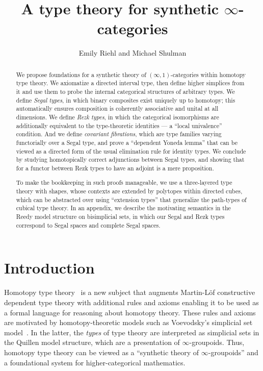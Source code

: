 \documentclass{amsart}
\title{A type theory for synthetic $\infty$-categories}
\author{Emily Riehl and Michael Shulman}
\theoremstyle{plain}
\theoremstyle{definition}
\theoremstyle{remark}
\numberwithin{equation}{section}
\begin{document}
\maketitle

\begin{abstract}
  We propose foundations for a synthetic theory of $(\infty,1)$-categories within homotopy type theory.
  We axiomatize a directed interval type, then define higher simplices from it and use them to probe the internal categorical structures of arbitrary types.
  We define \emph{Segal types}, in which binary composites exist uniquely up to homotopy; this automatically ensures composition is coherently associative and unital at all dimensions.
  We define \emph{Rezk types}, in which the categorical isomorphisms are additionally equivalent to the type-theoretic identities --- a ``local univalence'' condition.
  And we define \emph{covariant fibrations}, which are type families varying functorially over a Segal type, and prove a ``dependent Yoneda lemma'' that can be viewed as a directed form of the usual elimination rule for identity types.
  We conclude by studying homotopically correct adjunctions between Segal types, and showing that for a functor between Rezk types to have an adjoint is a mere proposition.

  To make the bookkeeping in such proofs manageable, we use a three-layered type theory with shapes, whose contexts are extended by polytopes within directed cubes, which can be abstracted over using ``extension types'' that generalize the path-types of cubical type theory.
  In an appendix, we describe the motivating semantics in the Reedy model structure on bisimplicial sets, in which our Segal and Rezk types correspond to Segal spaces and complete Segal spaces.
\end{abstract}


\tableofcontents

\section{Introduction}
\label{sec:introduction}

Homotopy type theory~\cite{hottbook} is a new subject that augments Martin-L\"{o}f constructive dependent type theory with additional rules and axioms enabling it to be used as a formal language for reasoning about homotopy theory.
These rules and axioms are motivated by homotopy-theoretic models such as Voevodsky's simplicial set model~\cite{simplicial-model}.
In the latter, the \emph{types} of type theory are interpreted as simplicial sets in the Quillen model structure, which are a presentation of $\infty$-groupoids.
Thus, homotopy type theory can be viewed as a ``synthetic theory of $\infty$-groupoids'' and a foundational system for higher-categorical mathematics.
\end{document}
